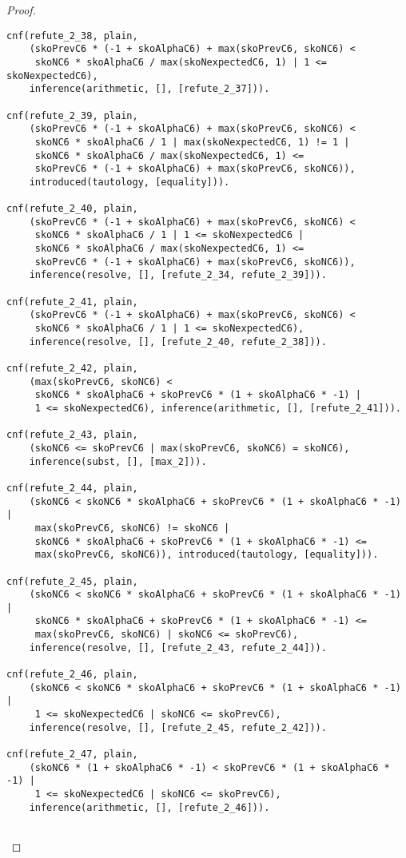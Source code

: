 \begin{proof}
\begin{verbatim}
cnf(refute_2_38, plain,
    (skoPrevC6 * (-1 + skoAlphaC6) + max(skoPrevC6, skoNC6) <
     skoNC6 * skoAlphaC6 / max(skoNexpectedC6, 1) | 1 <= skoNexpectedC6),
    inference(arithmetic, [], [refute_2_37])).

cnf(refute_2_39, plain,
    (skoPrevC6 * (-1 + skoAlphaC6) + max(skoPrevC6, skoNC6) <
     skoNC6 * skoAlphaC6 / 1 | max(skoNexpectedC6, 1) != 1 |
     skoNC6 * skoAlphaC6 / max(skoNexpectedC6, 1) <=
     skoPrevC6 * (-1 + skoAlphaC6) + max(skoPrevC6, skoNC6)),
    introduced(tautology, [equality])).

cnf(refute_2_40, plain,
    (skoPrevC6 * (-1 + skoAlphaC6) + max(skoPrevC6, skoNC6) <
     skoNC6 * skoAlphaC6 / 1 | 1 <= skoNexpectedC6 |
     skoNC6 * skoAlphaC6 / max(skoNexpectedC6, 1) <=
     skoPrevC6 * (-1 + skoAlphaC6) + max(skoPrevC6, skoNC6)),
    inference(resolve, [], [refute_2_34, refute_2_39])).

cnf(refute_2_41, plain,
    (skoPrevC6 * (-1 + skoAlphaC6) + max(skoPrevC6, skoNC6) <
     skoNC6 * skoAlphaC6 / 1 | 1 <= skoNexpectedC6),
    inference(resolve, [], [refute_2_40, refute_2_38])).

cnf(refute_2_42, plain,
    (max(skoPrevC6, skoNC6) <
     skoNC6 * skoAlphaC6 + skoPrevC6 * (1 + skoAlphaC6 * -1) |
     1 <= skoNexpectedC6), inference(arithmetic, [], [refute_2_41])).

cnf(refute_2_43, plain,
    (skoNC6 <= skoPrevC6 | max(skoPrevC6, skoNC6) = skoNC6),
    inference(subst, [], [max_2])).

cnf(refute_2_44, plain,
    (skoNC6 < skoNC6 * skoAlphaC6 + skoPrevC6 * (1 + skoAlphaC6 * -1) |
     max(skoPrevC6, skoNC6) != skoNC6 |
     skoNC6 * skoAlphaC6 + skoPrevC6 * (1 + skoAlphaC6 * -1) <=
     max(skoPrevC6, skoNC6)), introduced(tautology, [equality])).

cnf(refute_2_45, plain,
    (skoNC6 < skoNC6 * skoAlphaC6 + skoPrevC6 * (1 + skoAlphaC6 * -1) |
     skoNC6 * skoAlphaC6 + skoPrevC6 * (1 + skoAlphaC6 * -1) <=
     max(skoPrevC6, skoNC6) | skoNC6 <= skoPrevC6),
    inference(resolve, [], [refute_2_43, refute_2_44])).

cnf(refute_2_46, plain,
    (skoNC6 < skoNC6 * skoAlphaC6 + skoPrevC6 * (1 + skoAlphaC6 * -1) |
     1 <= skoNexpectedC6 | skoNC6 <= skoPrevC6),
    inference(resolve, [], [refute_2_45, refute_2_42])).

cnf(refute_2_47, plain,
    (skoNC6 * (1 + skoAlphaC6 * -1) < skoPrevC6 * (1 + skoAlphaC6 * -1) |
     1 <= skoNexpectedC6 | skoNC6 <= skoPrevC6),
    inference(arithmetic, [], [refute_2_46])).


\end{verbatim}
\end{proof}
